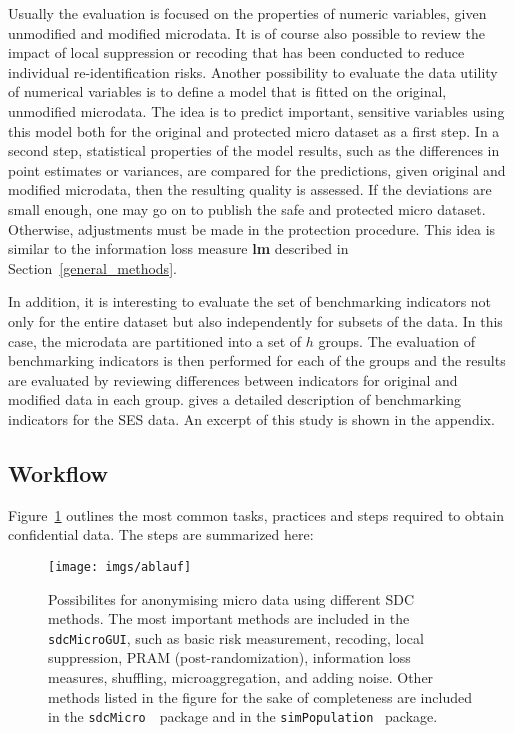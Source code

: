 \documentclass[12pt]{scrartcl}\usepackage[]{graphicx}\usepackage[]{color}
\newcommand{\sdcMicro}{\texttt{sdcMicro}}
\newcommand{\sdcMicroGUI}{\texttt{sdcMicroGUI}}
\begin{document}
Usually the evaluation is focused on the properties of numeric variables, given unmodified and modified microdata. It is of course also possible to review the impact of local suppression or recoding that has been conducted to reduce individual re-identification risks. Another possibility to evaluate the data utility of numerical variables is to define a model that is fitted on the original, unmodified microdata. The idea is to predict important, sensitive variables using this model both for the original and protected micro dataset as a first step. In a second step, statistical properties of the model results, such as the differences in point estimates or variances, are compared for the predictions, given original and modified microdata, then the resulting quality is assessed. If the deviations are small enough, one may go on to publish the safe and protected micro dataset. Otherwise, adjustments must be made in the protection procedure. This idea is similar to the information loss measure \textbf{lm} described in Section~\ref{general_methods}.

In addition, it is interesting to evaluate the set of benchmarking indicators not only for the entire dataset but also independently for subsets of the data. In this case, the microdata are partitioned into a set of $h$ groups. The evaluation of benchmarking indicators is then performed for each of the groups and the results are evaluated by reviewing differences between indicators for original and modified data in each group. \cite{caseStudies} gives a detailed description of benchmarking indicators for the SES data. An   excerpt of this study is shown in the appendix.

\subsection{Workflow}\label{workflow}
Figure~\ref{fig:ablauf} outlines the most common tasks, practices and steps required to obtain confidential data. The steps are summarized here:

\begin{figure}[ht]
\begin{center}
\texttt{[image: imgs/ablauf]}
\caption{\label{fig:ablauf}Possibilites for anonymising micro data using different SDC methods.
The most important methods are included in the \sdcMicroGUI , such as basic risk measurement, recoding, local suppression, PRAM (post-randomization), information loss measures, shuffling, microaggregation, and adding noise. Other methods listed in the figure for the sake of completeness are included in the \sdcMicro \ \R \ package and in the \texttt{simPopulation} \R \ package.}
\end{center}
\vspace{-0.4cm}
\end{figure}
\end{document}
